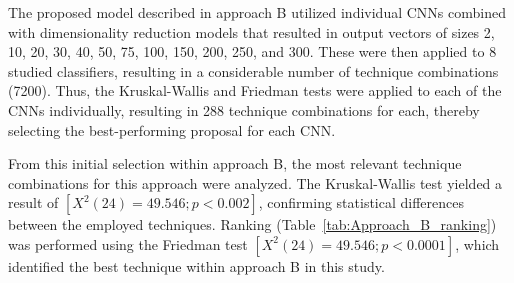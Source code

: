\documentclass[preprint,12pt]{elsarticle}
\begin{document}
The proposed model described in approach B utilized individual CNNs combined with dimensionality reduction models that resulted in output vectors of sizes 2, 10, 20, 30, 40, 50, 75, 100, 150, 200, 250, and 300. These were then applied to 8 studied classifiers, resulting in a considerable number of technique combinations (7200). Thus, the Kruskal-Wallis and Friedman tests were applied to each of the CNNs individually, resulting in 288 technique combinations for each, thereby selecting the best-performing proposal for each CNN.

From this initial selection within approach B, the most relevant technique combinations for this approach were analyzed. The Kruskal-Wallis test yielded a result of $[X^2(24)=49.546; p<0.002]$, confirming statistical differences between the employed techniques. Ranking (Table~\ref{tab:Approach_B_ranking}) was performed using the Friedman test $[X^2(24)=49.546; p<0.0001]$, which identified the best technique within approach B in this study.
\end{document}
